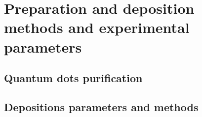 \chapter{Preparation and deposition methods and experimental parameters}

\section{Quantum dots purification}


\section{Depositions parameters and methods}



